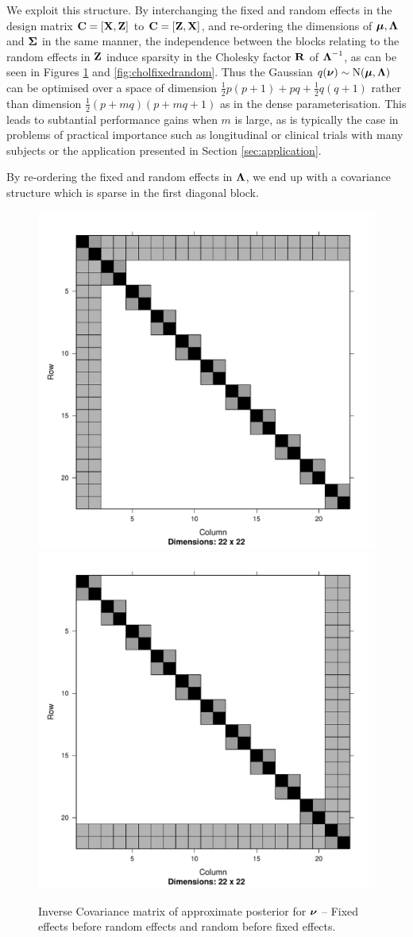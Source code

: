 \noindent We exploit this structure. By interchanging the fixed and random effects in the design matrix ${\bf C} = [{\bf X}, {\bf Z}]$ to ${\bf C} = [{\bf Z}, {\bf X}]$, and re-ordering the dimensions of ${\boldsymbol \mu}, {\boldsymbol \Lambda}$ and ${\boldsymbol \Sigma}$ in the same manner, the independence between the
blocks relating to the random effects in ${\bf Z}$ induce sparsity in the Cholesky factor ${\bf R}$ of
${\boldsymbol \Lambda}^{-1}$, as can be seen in Figures \ref{fig:covfixedrandom} and
\ref{fig:cholfixedrandom}. Thus the Gaussian $q({\boldsymbol \nu}) \sim \text{N}({\boldsymbol \mu}, {\boldsymbol \Lambda})$ can be optimised over a space of dimension $\frac{1}{2} p (p + 1) + pq + \frac{1}{2} q (q + 1)$ rather than dimension
$\frac{1}{2} (p + mq) (p + mq + 1)$ as in the dense parameterisation. This leads to subtantial performance gains
when $m$ is large, as is typically the case in problems of practical importance such as longitudinal or 
clinical trials with many subjects or the application presented in Section \ref{sec:application}.
		
By re-ordering the fixed and random effects in ${\boldsymbol \Lambda}$, we end up with a covariance structure which is 
sparse in the first diagonal block.

\begin{figure}[h!]
	\includegraphics[width=0.45 \textwidth]{mX_mZ_mLambda.pdf}
	\includegraphics[width=0.45 \textwidth]{mZ_mX_mLambda.pdf}
	\caption{Inverse Covariance matrix of approximate posterior for ${\boldsymbol \nu}$ -- Fixed effects before random effects
						and random before fixed effects.}
	\label{fig:covfixedrandom}
\end{figure}
	
